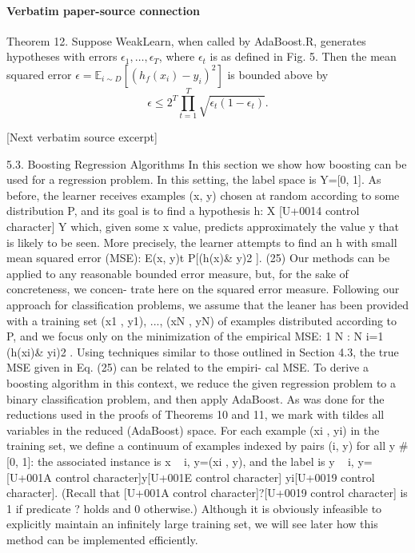 \documentclass[10pt]{article}
\begin{document}
\paragraph{Verbatim paper-source connection}
\begin{ReviewVerbatim}
Theorem 12. Suppose WeakLearn, when called by AdaBoost.R, generates
hypotheses with errors $\epsilon_1,\ldots,\epsilon_T$, where $\epsilon_t$ is
as defined in Fig. 5. Then the mean squared error
$\epsilon=\mathbb E_{i\sim D}[(h_f(x_i)-y_i)^2]$ is bounded above by
$$
\epsilon\leq2^T\prod_{t=1}^T\sqrt{\epsilon_t(1-\epsilon_t)}. \tag{26}
$$

[Next verbatim source excerpt]

5.3. Boosting Regression Algorithms
In this section we show how boosting can be used for a
regression problem. In this setting, the label space is
Y=[0, 1]. As before, the learner receives examples (x, y)
chosen at random according to some distribution P, and its
goal is to find a hypothesis h: X [U+0014 control character] Y which, given some x
value, predicts approximately the value y that is likely to be
seen. More precisely, the learner attempts to find an h with
small mean squared error (MSE):
E(x, y)t P[(h(x)& y)2
]. (25)
Our methods can be applied to any reasonable bounded
error measure, but, for the sake of concreteness, we concen-
trate here on the squared error measure.
Following our approach for classification problems, we
assume that the leaner has been provided with a training set
(x1 , y1), ..., (xN , yN) of examples distributed according to
P, and we focus only on the minimization of the empirical
MSE:
1
N
:
N
i=1
(h(xi)& yi)2
.
Using techniques similar to those outlined in Section 4.3,
the true MSE given in Eq. (25) can be related to the empiri-
cal MSE.
To derive a boosting algorithm in this context, we reduce
the given regression problem to a binary classification
problem, and then apply AdaBoost. As was done for the
reductions used in the proofs of Theorems 10 and 11, we
mark with tildes all variables in the reduced (AdaBoost)
space. For each example (xi , yi) in the training set, we
define a continuum of examples indexed by pairs (i, y) for
all y # [0, 1]: the associated instance is x
~ i, y=(xi , y), and
the label is y
~ i, y=[U+001A control character]y[U+001E control character] yi[U+0019 control character]. (Recall that [U+001A control character]?[U+0019 control character] is 1 if predicate
? holds and 0 otherwise.) Although it is obviously infeasible
to explicitly maintain an infinitely large training set, we will
see later how this method can be implemented efficiently.

\end{ReviewVerbatim}
\end{document}

